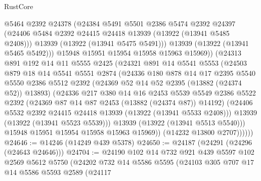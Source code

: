 \begin{lexlean}{RustCore}
\begin{coremodule}
                  @5464
                  @2392
                  @24378
                  (@24384
                    @5491
                    @5501
                    @2386
                    @5474
                    @2392
                    @24397
                    (@24406 @5484 @2392 @24415 @24418 @13939 (@13922 (@13941 @5485 @2408)))
                    @13939
                    (@13922 (@13941 @5475 @5491)))
                  @13939
                  (@13922 (@13941 @5465 @5492)))
                @15948
                @15951
                @15954
                @15958
                @15963
                @15969))
            (@24313
              @891
              @192
              @14
              @11
              @5555
              @2425
              (@24321
                @891
                @14
                @5541
                @5553
                (@24503
                  @879
                  @18
                  @14
                  @5541
                  @5551
                  @2874
                  (@24336
                    @180
                    @878
                    @14
                    @17
                    @2395
                    @5540
                    @5550
                    @2386
                    @5512
                    @2392
                    (@24369 @52 @14 @52 @2395 (@13882 (@24374 @52)) @13893)
                    (@24336
                      @217
                      @380
                      @14
                      @16
                      @2453
                      @5539
                      @5549
                      @2386
                      @5522
                      @2392
                      (@24369 @87 @14 @87 @2453 (@13882 (@24374 @87)) @14192)
                      (@24406 @5532 @2392 @24415 @24418 @13939 (@13922 (@13941 @5533 @2408)))
                      @13939
                      (@13922 (@13941 @5523 @5539)))
                    @13939
                    (@13922 (@13941 @5513 @5540)))
                  @15948
                  @15951
                  @15954
                  @15958
                  @15963
                  @15969))
              (@14232 @13800 @2707))))))
@24646 := @14246 (@14249 @439 @5378)
@24650 := @24187 (@24291 (@24296 (@24643 @24646)))
@24704 := @24190
    @102
    @14
    @732
    @921
    @439
    @5597
    @102
    @2569
    @5612
    @5750
    (@24202
      @732
      @14
      @5586
      @5595
      (@24103
        @305
        @707
        @17
        @14
        @5586
        @5593
        @2589
        (@24117

\end{coremodule}
\end{lexlean}
